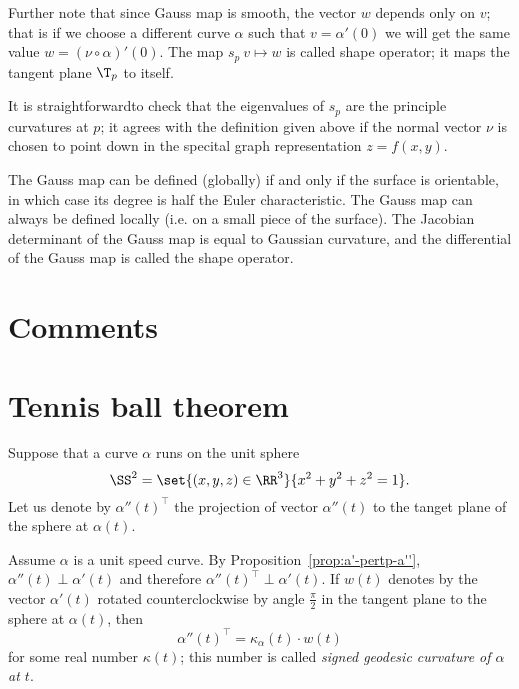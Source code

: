 Further note that since Gauss map is smooth,
the vector $w$ depends only on $v$;
that is if we choose a different curve $\alpha$ such that $v=\alpha'(0)$ we will get the same value $w=(\nu\circ\alpha)'(0)$.
The map $s_p\:v\mapsto w$ is called shape operator;
it maps the tangent plane $\T_p$ to itself.

It is straightforwardto check that the eigenvalues of $s_p$ are the principle curvatures at $p$; it agrees with the definition given above if the normal vector $\nu$ is chosen to point down in the specital graph representation $z=f(x,y)$.







The Gauss map can be defined (globally) if and only if the surface is orientable, in which case its degree is half the Euler characteristic. The Gauss map can always be defined locally (i.e. on a small piece of the surface). The Jacobian determinant of the Gauss map is equal to Gaussian curvature, and the differential of the Gauss map is called the shape operator. 


















\section{Comments}


\section{Tennis ball theorem}

Suppose that a curve $\alpha$ runs on the unit sphere 
\[\SS^2=\set{(x,y,z)\in\RR^3}{x^2+y^2+z^2=1}.\] 
Let us denote by $\alpha''(t)^\top$ the projection of vector $\alpha''(t)$ to the tanget plane of the sphere at $\alpha(t)$.

Assume $\alpha$ is a unit speed curve.
By Proposition~\ref{prop:a'-pertp-a''}, $\alpha''(t)\perp\alpha'(t)$ and therefore $\alpha''(t)^\top\perp\alpha'(t)$.
If $w(t)$ denotes by the vector $\alpha'(t)$ rotated
counterclockwise by angle $\tfrac\pi2$ in the tangent plane to the sphere at $\alpha(t)$, then 
\[\alpha''(t)^\top=\kappa_\alpha(t)\cdot w(t)\]
for some real number $\kappa(t)$;
this number is called \emph{signed geodesic curvature of $\alpha$ at $t$}.


